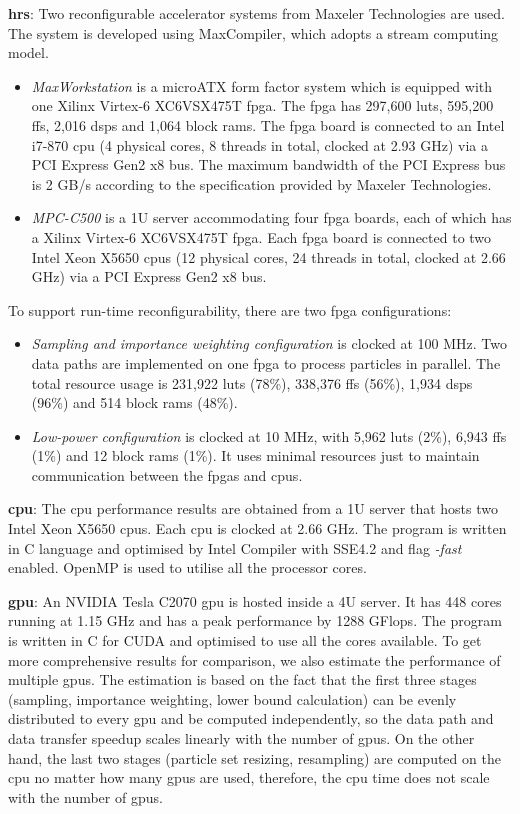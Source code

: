\textbf{\gls{hrs}}: Two reconfigurable accelerator systems from Maxeler Technologies are used.
The system is developed using MaxCompiler, which adopts a stream computing model.
\begin{itemize}
\item \textit{MaxWorkstation} is a microATX form factor system which is equipped with one Xilinx Virtex-6 XC6VSX475T \gls{fpga}.
The \gls{fpga} has 297,600 \glspl{lut}, 595,200 \glspl{ff}, 2,016 \glspl{dsp} and 1,064 block \glspl{ram}. 
The \gls{fpga} board is connected to an Intel i7-870 \gls{cpu} (4 physical cores, 8 threads in total, clocked at 2.93 GHz) via a PCI Express Gen2 x8 bus.
The maximum bandwidth of the PCI Express bus is 2 GB/s according to the specification provided by Maxeler Technologies.
\item \textit{MPC-C500} is a 1U server accommodating four \gls{fpga} boards, each of which has a Xilinx Virtex-6 XC6VSX475T \gls{fpga}.
Each \gls{fpga} board is connected to two Intel Xeon X5650 \gls{cpu}s (12 physical cores, 24 threads in total, clocked at 2.66 GHz) via a PCI Express Gen2 x8 bus.
\end{itemize}

To support run-time reconfigurability, there are two \gls{fpga} configurations:
\begin{itemize}
\item {\it Sampling and importance weighting configuration} is clocked at 100 MHz.
Two data paths are implemented on one \gls{fpga} to process particles in parallel.
The total resource usage is 231,922 \glspl{lut} (78\%), 338,376 \glspl{ff} (56\%), 1,934 \glspl{dsp} (96\%) and 514 block \glspl{ram} (48\%).
\item {\it Low-power configuration} is clocked at 10 MHz, with 5,962 \glspl{lut} (2\%), 6,943 \glspl{ff} (1\%) and 12 block \glspl{ram} (1\%).
It uses minimal resources just to maintain communication between the \gls{fpga}s and \gls{cpu}s.
\end{itemize}

\textbf{\gls{cpu}}: The \gls{cpu} performance results are obtained from a 1U server that hosts two Intel Xeon X5650 \gls{cpu}s. 
Each \gls{cpu} is clocked at 2.66 GHz.
The program is written in C language and optimised by Intel Compiler with SSE4.2 and flag {\it -fast} enabled.
OpenMP is used to utilise all the processor cores.

\textbf{\gls{gpu}}: An NVIDIA Tesla C2070 \gls{gpu} is hosted inside a 4U server.
It has 448 cores running at 1.15 GHz and has a peak performance by 1288 GFlops.
The program is written in C for CUDA and optimised to use all the cores available.
To get more comprehensive results for comparison, we also estimate the performance of multiple \gls{gpu}s.
The estimation is based on the fact that the first three stages (sampling, importance weighting, lower bound calculation) can be evenly distributed to every \gls{gpu} and be computed independently, 
so the data path and data transfer speedup scales linearly with the number of \gls{gpu}s.
On the other hand, the last two stages (particle set resizing, resampling) are computed on the \gls{cpu} no matter how many \gls{gpu}s are used, therefore, the \gls{cpu} time does not scale with the number of \gls{gpu}s.

